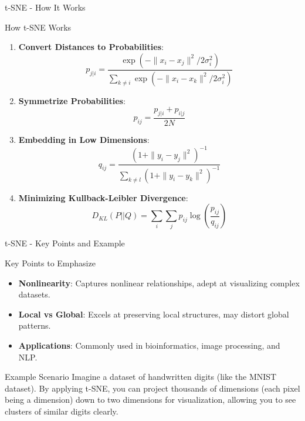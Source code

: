 \documentclass[aspectratio=169]{beamer}
\begin{document}
\begin{frame}[fragile]{t-SNE - How It Works}
  \begin{block}{How t-SNE Works}
    \begin{enumerate}
      \item \textbf{Convert Distances to Probabilities}:
        \begin{equation}
        p_{j|i} = \frac{\exp(-\|x_i - x_j\|^2 / 2\sigma_i^2)}{\sum_{k \neq i} \exp(-\|x_i - x_k\|^2 / 2\sigma_i^2)}
        \end{equation}
      \item \textbf{Symmetrize Probabilities}:
        \begin{equation}
        p_{ij} = \frac{p_{j|i} + p_{i|j}}{2N}
        \end{equation}
      \item \textbf{Embedding in Low Dimensions}:
        \begin{equation}
        q_{ij} = \frac{(1 + \|y_i - y_j\|^2)^{-1}}{\sum_{k \neq l} (1 + \|y_i - y_k\|^2)^{-1}}
        \end{equation}
      \item \textbf{Minimizing Kullback-Leibler Divergence}:
        \begin{equation}
        D_{KL}(P || Q) = \sum_{i} \sum_{j} p_{ij} \log\left(\frac{p_{ij}}{q_{ij}}\right)
        \end{equation}
    \end{enumerate}
  \end{block}
\end{frame}

\begin{frame}[fragile]{t-SNE - Key Points and Example}
  \begin{block}{Key Points to Emphasize}
    \begin{itemize}
      \item \textbf{Nonlinearity}: Captures nonlinear relationships, adept at visualizing complex datasets.
      \item \textbf{Local vs Global}: Excels at preserving local structures, may distort global patterns.
      \item \textbf{Applications}: Commonly used in bioinformatics, image processing, and NLP.
    \end{itemize}
  \end{block}
  
  \begin{block}{Example Scenario}
    Imagine a dataset of handwritten digits (like the MNIST dataset). By applying t-SNE, you can project thousands of dimensions (each pixel being a dimension) down to two dimensions for visualization, allowing you to see clusters of similar digits clearly.
  \end{block}
\end{frame}
\end{document}
